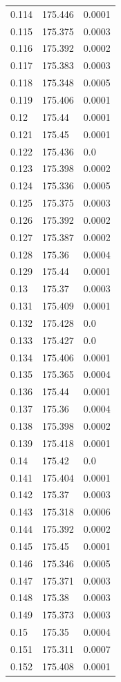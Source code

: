\begin{table}[H]
\begin{tabular}{lll}
0.114 & 175.446 & 0.0001 \\
0.115 & 175.375 & 0.0003 \\
0.116 & 175.392 & 0.0002 \\
0.117 & 175.383 & 0.0003 \\
0.118 & 175.348 & 0.0005 \\
0.119 & 175.406 & 0.0001 \\
0.12 & 175.44 & 0.0001 \\
0.121 & 175.45 & 0.0001 \\
0.122 & 175.436 & 0.0 \\
0.123 & 175.398 & 0.0002 \\
0.124 & 175.336 & 0.0005 \\
0.125 & 175.375 & 0.0003 \\
0.126 & 175.392 & 0.0002 \\
0.127 & 175.387 & 0.0002 \\
0.128 & 175.36 & 0.0004 \\
0.129 & 175.44 & 0.0001 \\
0.13 & 175.37 & 0.0003 \\
0.131 & 175.409 & 0.0001 \\
0.132 & 175.428 & 0.0 \\
0.133 & 175.427 & 0.0 \\
0.134 & 175.406 & 0.0001 \\
0.135 & 175.365 & 0.0004 \\
0.136 & 175.44 & 0.0001 \\
0.137 & 175.36 & 0.0004 \\
0.138 & 175.398 & 0.0002 \\
0.139 & 175.418 & 0.0001 \\
0.14 & 175.42 & 0.0 \\
0.141 & 175.404 & 0.0001 \\
0.142 & 175.37 & 0.0003 \\
0.143 & 175.318 & 0.0006 \\
0.144 & 175.392 & 0.0002 \\
0.145 & 175.45 & 0.0001 \\
0.146 & 175.346 & 0.0005 \\
0.147 & 175.371 & 0.0003 \\
0.148 & 175.38 & 0.0003 \\
0.149 & 175.373 & 0.0003 \\
0.15 & 175.35 & 0.0004 \\
0.151 & 175.311 & 0.0007 \\
0.152 & 175.408 & 0.0001 \\

\end{tabular}
\end{table}

